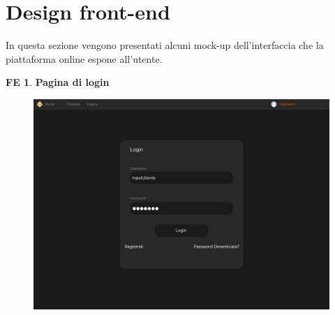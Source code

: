 \documentclass[11pt, a4paper]{article}
\theoremstyle{definition}
\newtheorem{nonfuncreq}{RNF} %
\newtheorem{frontend}{FE}
\begin{document}



\newpage
\section{Design front-end}
In questa sezione vengono presentati alcuni mock-up dell'interfaccia che
la piattaforma online espone all'utente.

\begin{frontend}
\textbf{Pagina di login }
\end{frontend}
\begin{figure}[H]
\centering
\includegraphics[scale=0.2]{materiale/immaginife/login.jpeg}
\end{figure}
\end{document}
